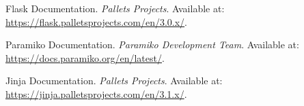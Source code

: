 \documentclass[polish,12pt,twoside,a4paper]{report}
\begin{document}




\newpage

\newpage

\newpage

\newpage

\newpage

\newpage

\begin{thebibliography}{9}

    Flask Documentation. 
    \textit{Pallets Projects}. 
    Available at: \url{https://flask.palletsprojects.com/en/3.0.x/}.
    
    Paramiko Documentation. 
    \textit{Paramiko Development Team}. 
    Available at: \url{https://docs.paramiko.org/en/latest/}.
    
    Jinja Documentation. 
    \textit{Pallets Projects}. 
    Available at: \url{https://jinja.palletsprojects.com/en/3.1.x/}.
\end{thebibliography}
\newpage


\end{document}

